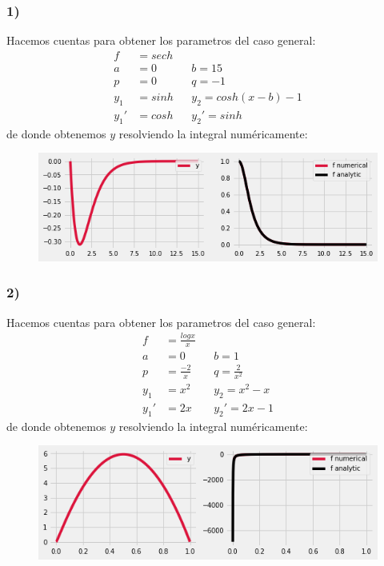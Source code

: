 \documentclass{article}
\begin{document}
\begin{tcolorbox}[breakable]
    \subsubsection*{1)}
    Hacemos cuentas para obtener los parametros del caso general:
    \begin{align*}
        f&= sech \\
        a&=0 &&b=15 \\
        p&=0 &&q=-1 \\
        y_1 &= sinh  &&y_2= cosh(x-b)-1 \\
        y_1' &= cosh &&y_2'=sinh 
    \end{align*}
    de donde obtenemos $y$ resolviendo la integral numéricamente:
    \begin{figure}[H]
        \centering
        \includegraphics[scale=0.7]{images/p3_1.png}
    \end{figure}

    \subsubsection*{2)}
    Hacemos cuentas para obtener los parametros del caso general:
    \begin{align*}
        f&= \frac{logx}{x} \\
        a&=0 &&b=1 \\
        p&=\frac{-2}{x} &&q= \frac{2}{x^2} \\
        y_1 &= x^2  &&y_2= x^2-x \\
        y_1' &= 2x &&y_2'= 2x-1 
    \end{align*}
    de donde obtenemos $y$ resolviendo la integral numéricamente:
    \begin{figure}[H]
        \centering
        \includegraphics[scale=0.7]{images/p3_2.png}
    \end{figure}


\end{tcolorbox}
\end{document}
